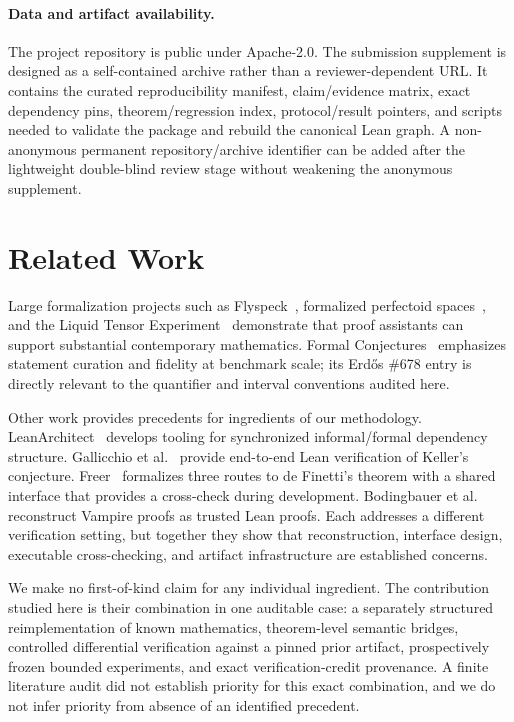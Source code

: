 \documentclass[sigplan,10pt,anonymous,review]{acmart}
\begin{document}
\paragraph{Data and artifact availability.}
The project repository is public under Apache-2.0. The submission supplement is designed as a self-contained archive rather than a reviewer-dependent URL. It contains the curated reproducibility manifest, claim/evidence matrix, exact dependency pins, theorem/regression index, protocol/result pointers, and scripts needed to validate the package and rebuild the canonical Lean graph. A non-anonymous permanent repository/archive identifier can be added after the lightweight double-blind review stage without weakening the anonymous supplement.

\section{Related Work}
Large formalization projects such as Flyspeck~\cite{hales2017}, formalized perfectoid spaces~\cite{buzzard2020}, and the Liquid Tensor Experiment~\cite{scholze2022} demonstrate that proof assistants can support substantial contemporary mathematics. Formal Conjectures~\cite{firsching2026} emphasizes statement curation and fidelity at benchmark scale; its Erd\H{o}s \#678 entry is directly relevant to the quantifier and interval conventions audited here.

Other work provides precedents for ingredients of our methodology. LeanArchitect~\cite{zhu2026} develops tooling for synchronized informal/formal dependency structure. Gallicchio et al.~\cite{gallicchio2026} provide end-to-end Lean verification of Keller's conjecture. Freer~\cite{freer2026} formalizes three routes to de Finetti's theorem with a shared interface that provides a cross-check during development. Bodingbauer et al.~\cite{bodingbauer2026} reconstruct Vampire proofs as trusted Lean proofs. Each addresses a different verification setting, but together they show that reconstruction, interface design, executable cross-checking, and artifact infrastructure are established concerns.

We make no first-of-kind claim for any individual ingredient. The contribution studied here is their combination in one auditable case: a separately structured reimplementation of known mathematics, theorem-level semantic bridges, controlled differential verification against a pinned prior artifact, prospectively frozen bounded experiments, and exact verification-credit provenance. A finite literature audit did not establish priority for this exact combination, and we do not infer priority from absence of an identified precedent.
\end{document}
